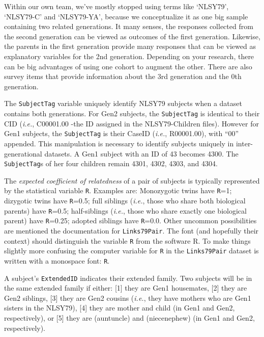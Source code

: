 \documentclass[smallextended]{svjour3}       %
\begin{document}
Within our own team, we've mostly stopped using terms like `NLSY79',
`NLSY79-C' and `NLSY79-YA', because we conceptualize it as one big
sample containing two related generations. It many senses, the responses
collected from the second generation can be viewed as outcomes of the
first generation. Likewise, the parents in the first generation provide
many responses that can be viewed as explanatory variables for the 2nd
generation. Depending on your research, there can be big advantages of
using one cohort to augment the other. There are also survey items that
provide information about the 3rd generation and the 0th generation.

The \texttt{SubjectTag} variable uniquely identify NLSY79 subjects when
a dataset contains both generations. For Gen2 subjects, the
\texttt{SubjectTag} is identical to their CID (\emph{i.e.}, C00001.00
-the ID assigned in the NLSY79-Children files). However for Gen1
subjects, the \texttt{SubjectTag} is their CaseID (\emph{i.e.},
R00001.00), with ``00'' appended. This manipulation is necessary to
identify subjects uniquely in inter-generational datasets. A Gen1
subject with an ID of 43 becomes 4300. The \texttt{SubjectTag}s of her
four children remain 4301, 4302, 4303, and 4304.

The \emph{expected coefficient of relatedness} of a pair of subjects is
typically represented by the statistical variable \texttt{R}. Examples
are: Monozygotic twins have \texttt{R}=1; dizygotic twins have
\texttt{R}=0.5; full siblings (\emph{i.e.}, those who share both
biological parents) have \texttt{R}=0.5; half-siblings (\emph{i.e.},
those who share exactly one biological parent) have \texttt{R}=0.25;
adopted siblings have \texttt{R}=0.0. Other uncommon possibilities are
mentioned the documentation for \texttt{Links79Pair}. The font (and
hopefully their context) should distinguish the variable \texttt{R} from
the software R. To make things slightly more confusing the computer
variable for \texttt{R} in the \texttt{Links79Pair} dataset is written
with a monospace font: \texttt{R}.

A subject's \texttt{ExtendedID} indicates their extended family. Two
subjects will be in the same extended family if either: {[}1{]} they are
Gen1 housemates, {[}2{]} they are Gen2 siblings, {[}3{]} they are Gen2
cousins (\emph{i.e.}, they have mothers who are Gen1 sisters in the
NLSY79), {[}4{]} they are mother and child (in Gen1 and Gen2,
respectively), or {[}5{]} they are (aunt\textbar uncle) and
(niece\textbar nephew) (in Gen1 and Gen2, respectively).
\end{document}
